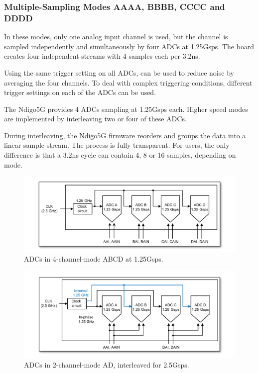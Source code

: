 \subsubsection{Multiple-Sampling Modes AAAA, BBBB, CCCC and DDDD}

In these modes, only one analog input channel is used, but the channel is sampled independently and simultaneously by four ADCs at 1.25Gsps. The board creates four independent streams with 4 samples each per 3.2ns.\par
Using the same trigger setting on all ADCs, can be used to reduce noise by averaging the four channels. To deal with complex triggering conditions, different trigger settings on each of the ADCs can be used.\par
The Ndigo5G provides 4 ADCs sampling at 1.25Gsps each. Higher speed modes are implemented by interleaving two or four of these ADCs.\par
During interleaving, the Ndigo5G firmware reorders and groups the data into a linear sample stream. The process is fully transparent. For users, the only difference is that a 3.2ns cycle can contain 4, 8 or 16 samples, depending on mode.

\begin{figure}
    \centering
    \includegraphics[width=\textwidth]{figures/4ChannelMode.pdf}
    \caption{ADCs in 4-channel-mode ABCD at 1.25Gsps.\label{fig:4ChannelMode}}
\end{figure}

\begin{figure}
    \centering
    \includegraphics[width=\textwidth]{figures/2ChannelMode.pdf}
    \caption{ADCs in 2-channel-mode AD, interleaved for 2.5Gsps.\label{fig:2ChannelMode}}
\end{figure}

